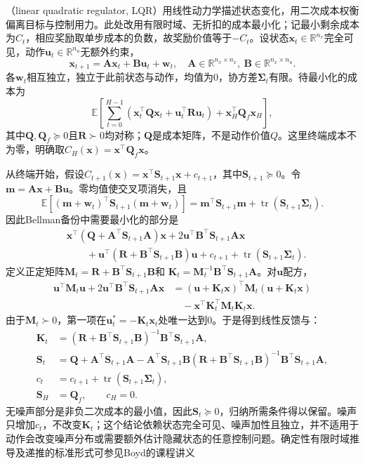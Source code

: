 （linear quadratic regulator, LQR）用线性动力学描述状态变化，用二次成本权衡偏离目标与控制用力。此处改用有限时域、无折扣的成本最小化；记最小剩余成本为$C_t$，相应奖励取单步成本的负数，故奖励价值等于$-C_t$。设状态$\bm x_t\in\mathbb R^{n_x}$完全可见，动作$\bm u_t\in\mathbb R^{n_u}$无额外约束，
\[
 \bm x_{t+1}=\bm A\bm x_t+\bm B\bm u_t+\bm w_t,
 \quad
 \bm A\in\mathbb R^{n_x\times n_x},\
 \bm B\in\mathbb R^{n_x\times n_u}.
\]
各$\bm w_t$相互独立，独立于此前状态与动作，均值为0，协方差$\bm\Sigma_t$有限。待最小化的成本为
\begin{equation}
 \mathbb E\!\left[
 \sum_{t=0}^{H-1}
  (\bm x_t^\top\bm Q\bm x_t+\bm u_t^\top\bm R\bm u_t)
 +\bm x_H^\top\bm Q_f\bm x_H\right],
 \label{eq:rl-planning-lqr-cost}
\end{equation}
其中$\bm Q,\bm Q_f\succeq0$且$\bm R\succ0$均对称；$\bm Q$是成本矩阵，不是动作价值$Q$。这里终端成本不为零，明确取$C_H(\bm x)=\bm x^\top\bm Q_f\bm x$。

从终端开始，假设$C_{t+1}(\bm x)=\bm x^\top\bm S_{t+1}\bm x+c_{t+1}$，其中$\bm S_{t+1}\succeq0$。令$\bm m=\bm A\bm x+\bm B\bm u$。零均值使交叉项消失，且
\[
 \mathbb E[(\bm m+\bm w_t)^\top\bm S_{t+1}(\bm m+\bm w_t)]
 =\bm m^\top\bm S_{t+1}\bm m+
   \operatorname{tr}(\bm S_{t+1}\bm\Sigma_t).
\]
因此Bellman备份中需要最小化的部分是
\[
 \begin{aligned}
 &\bm x^\top(\bm Q+\bm A^\top\bm S_{t+1}\bm A)\bm x
 +2\bm u^\top\bm B^\top\bm S_{t+1}\bm A\bm x\\
 &\qquad+\bm u^\top(\bm R+\bm B^\top\bm S_{t+1}\bm B)\bm u
 +c_{t+1}+\operatorname{tr}(\bm S_{t+1}\bm\Sigma_t).
 \end{aligned}
 \]
定义正定矩阵$\bm M_t=\bm R+\bm B^\top\bm S_{t+1}\bm B$和
$\bm K_t=\bm M_t^{-1}\bm B^\top\bm S_{t+1}\bm A$。对$\bm u$配方，
\[
 \begin{aligned}
 \bm u^\top\bm M_t\bm u+
 2\bm u^\top\bm B^\top\bm S_{t+1}\bm A\bm x
 &=(\bm u+\bm K_t\bm x)^\top\bm M_t(\bm u+\bm K_t\bm x)\\
 &\quad-\bm x^\top\bm K_t^\top\bm M_t\bm K_t\bm x.
 \end{aligned}
 \]
由于$\bm M_t\succ0$，第一项在$\bm u_t^*=-\bm K_t\bm x_t$处唯一达到0。于是得到线性反馈与：
\begin{equation}
 \begin{aligned}
 \bm K_t&=(\bm R+\bm B^\top\bm S_{t+1}\bm B)^{-1}
                \bm B^\top\bm S_{t+1}\bm A,\\
 \bm S_t&=\bm Q+\bm A^\top\bm S_{t+1}\bm A
   -\bm A^\top\bm S_{t+1}\bm B
      (\bm R+\bm B^\top\bm S_{t+1}\bm B)^{-1}
      \bm B^\top\bm S_{t+1}\bm A,\\
 c_t&=c_{t+1}+\operatorname{tr}(\bm S_{t+1}\bm\Sigma_t),\\
 \bm S_H&=\bm Q_f,\qquad c_H=0.
 \end{aligned}
 \label{eq:rl-planning-riccati}
\end{equation}
无噪声部分是非负二次成本的最小值，因此$\bm S_t\succeq0$，归纳所需条件得以保留。噪声只增加$c_t$，不改变$\bm K_t$；这个结论依赖状态完全可见、噪声加性且独立，并不适用于动作会改变噪声分布或需要额外估计隐藏状态的任意控制问题。确定性有限时域推导及递推的标准形式可参见Boyd的课程讲义


